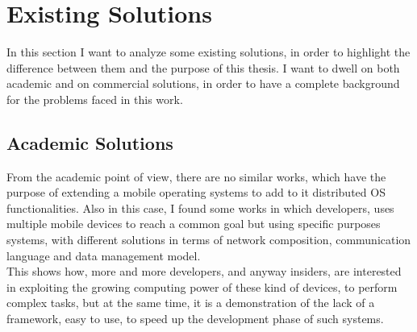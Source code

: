 \section{Existing Solutions}\label{existings}
In this section I want to analyze some existing solutions, in order to highlight the difference between them and the purpose of this thesis. I want to dwell on both academic and on commercial solutions, in order to have a complete background for the problems faced in this work.
\subsection{Academic Solutions}
From the academic point of view, there are no similar works, which have the purpose of extending a mobile operating systems to add to it distributed OS functionalities. Also in this case, I found some works in which developers, uses multiple mobile devices to reach a common goal but using specific purposes systems, with different solutions in terms of network composition, communication language and data management model.\\
This shows how, more and more developers, and anyway insiders, are interested in exploiting the growing computing power of these kind of devices, to perform complex tasks, but at the same time, it is a demonstration of the lack of a framework, easy to use, to speed up the development phase of such systems.
